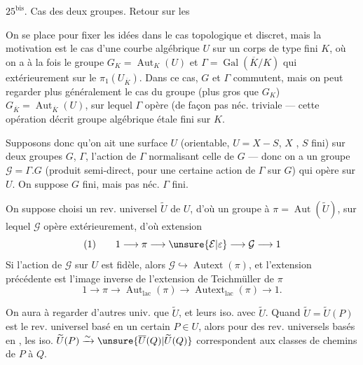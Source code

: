 $25^{\mathrm{bis}}$. Cas des deux groupes. Retour sur les 

On se place  pour fixer les idées dans le cas
topologique et discret, mais la motivation est
le cas d'une courbe algébrique $U$ sur un
corps de type fini $K$, où on a à la fois
le groupe $G_K=\operatorname{Aut}_K(U)$ et $\Gamma=\operatorname{Gal}(\overline K/K)$
qui  extérieurement sur le $\pi_1(U_{\overline K})$.
Dans ce cas, $G$ et $\Gamma$ commutent, mais
on peut regarder plus généralement le cas
du groupe (plus gros que $G_K$) $G_{\overline K}=\operatorname{Aut}_{\overline K}(U)$,
sur lequel $\Gamma$ opère (de façon pas néc. triviale
--- cette opération décrit  groupe algébrique
étale fini sur $K$.

Supposons donc qu'on ait une surface
$U$ (orientable, $U=X-S$, $X$  , $S$ fini)
sur   deux groupes $G$, $\Gamma$,
l'action de $\Gamma$ normalisant celle de $G$
--- donc on a un groupe $\mathcal G=\Gamma . G$ (produit
semi-direct, pour une certaine action de $\Gamma$
sur $G$) qui opère sur $U$. On suppose $G$
fini, mais pas néc. $\Gamma$ fini.


On suppose choisi un rev. universel $\widetilde U$ de $U$, d'où un groupe à  $\pi=\operatorname{Aut}(\widetilde U)$, sur lequel $\mathcal G$ opère extérieurement, d'où extension
\[
(1)\qquad 1\longrightarrow\pi\longrightarrow\unsure{\mathcal E|\varepsilon}\longrightarrow\mathcal G\longrightarrow 1
\]
Si l'action de $\mathcal G$ sur $U$  est fidèle,
alors $\mathcal G\hookrightarrow\operatorname{Autext}(\pi)$, et l'extension précédente est l'image inverse de l'extension de Teichmüller de $\pi$
\[
1\longrightarrow\pi\longrightarrow\operatorname{Aut}_{\mathrm{lac}}(\pi)\longrightarrow\operatorname{Autext}_{\mathrm{lac}}(\pi)\longrightarrow 1.
\]

 On aura à regarder d'autres  univ. que $\widetilde U$, et leurs iso. avec $\widetilde U$.
Quand $\widetilde U=\widetilde U(P)$ est le rev. universel basé en un certain $P\in U$, alors pour des rev. universels  basés en   ,
les iso. $\widetilde U(P)\xrightarrow{\sim}\unsure{\overline U(Q)|\widetilde U(Q)}$ correspondent  aux classes de chemins de $P$ à $Q$.

